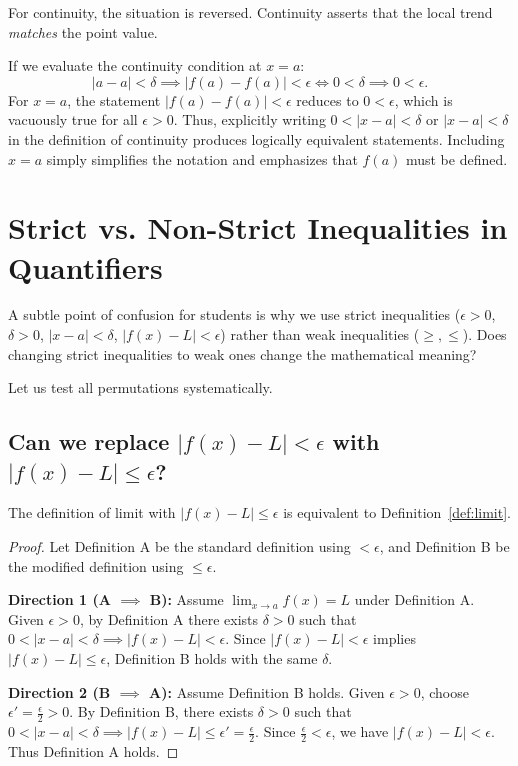 \documentclass{essay}
\begin{document}
For continuity, the situation is reversed. Continuity asserts that the local trend \emph{matches} the point value.

If we evaluate the continuity condition at $x = a$:
\[
|a - a| < \delta \implies |f(a) - f(a)| < \epsilon \iff 0 < \delta \implies 0 < \epsilon.
\]
For $x = a$, the statement $|f(a) - f(a)| < \epsilon$ reduces to $0 < \epsilon$, which is vacuously true for all $\epsilon > 0$. Thus, explicitly writing $0 < |x - a| < \delta$ or $|x - a| < \delta$ in the definition of continuity produces logically equivalent statements. Including $x = a$ simply simplifies the notation and emphasizes that $f(a)$ must be defined.

\section{Strict vs. Non-Strict Inequalities in Quantifiers}

A subtle point of confusion for students is why we use strict inequalities ($\epsilon > 0$, $\delta > 0$, $|x - a| < \delta$, $|f(x) - L| < \epsilon$) rather than weak inequalities ($\ge, \le$). Does changing strict inequalities to weak ones change the mathematical meaning?

Let us test all permutations systematically.

\subsection{Can we replace $|f(x) - L| < \epsilon$ with $|f(x) - L| \le \epsilon$?}

\begin{theorem}
The definition of limit with $|f(x) - L| \le \epsilon$ is equivalent to Definition~\ref{def:limit}.
\end{theorem}

\begin{proof}
Let Definition A be the standard definition using $< \epsilon$, and Definition B be the modified definition using $\le \epsilon$.

\textbf{Direction 1 (A $\implies$ B):} Assume $\lim_{x \to a} f(x) = L$ under Definition A. Given $\epsilon > 0$, by Definition A there exists $\delta > 0$ such that $0 < |x - a| < \delta \implies |f(x) - L| < \epsilon$. Since $|f(x) - L| < \epsilon$ implies $|f(x) - L| \le \epsilon$, Definition B holds with the same $\delta$.

\textbf{Direction 2 (B $\implies$ A):} Assume Definition B holds. Given $\epsilon > 0$, choose $\epsilon' = \frac{\epsilon}{2} > 0$. By Definition B, there exists $\delta > 0$ such that $0 < |x - a| < \delta \implies |f(x) - L| \le \epsilon' = \frac{\epsilon}{2}$. Since $\frac{\epsilon}{2} < \epsilon$, we have $|f(x) - L| < \epsilon$. Thus Definition A holds.
\end{proof}
\end{document}
